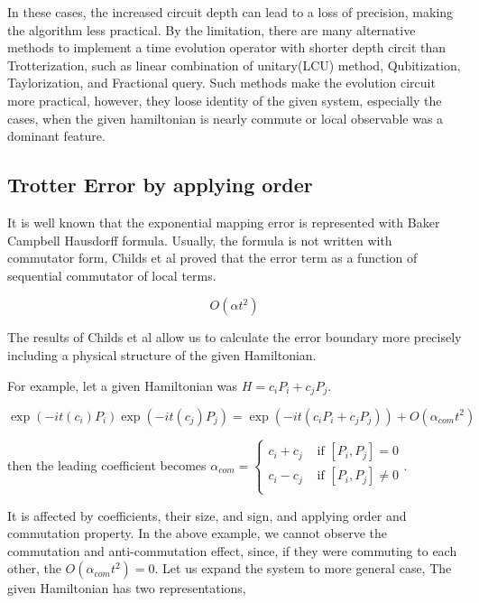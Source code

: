 \documentclass[a4paper,12pt]{article}
\begin{document}
In these cases, the increased circuit depth can lead to a loss of precision, making the algorithm less practical.
By the limitation, there are many alternative methods to implement a time evolution operator 
with shorter depth circit than Trotterization, such as 
linear combination of unitary(LCU) method\cite{dewolf2023quantumcomputinglecturenotes}, Qubitization\cite{Low_2019}, 
Taylorization\cite{PhysRevLett.114.090502}, and Fractional query\cite{Berry_2014}.
Such methods make the evolution circuit more practical, however, they loose 
identity of the given system, especially the cases, when the given hamiltonian is nearly commute
or local observable was a dominant feature\cite{childs_theory_2021}. 

\subsection{Trotter Error by applying order}

It is well known that the exponential mapping error is represented with Baker Campbell Hausdorff formula.
Usually, the formula is not written with commutator form, Childs et al proved that the error term 
as a function of sequential commutator of local terms.%

\begin{equation}
    O(\alpha t^2)
\end{equation}

The results of Childs et al allow us to calculate 
the error boundary more precisely including a physical structure 
of the given Hamiltonian.

For example, let a given Hamiltonian was $H = c_i P_i + c_j P_j$.

\begin{equation}
    \exp(-it (c_i) P_i) \exp(-it (c_j) P_j) = \exp(- it (c_i P_i + c_j P_j)) + O (\alpha_{com}t^2)
\end{equation}

then the leading coefficient becomes $\alpha_{com} = \begin{cases}
    c_i + c_j & \mbox{ if } [P_i, P_j] = 0 \\
    c_i - c_j & \mbox{ if } [P_i, P_j] \neq 0 \\
\end{cases}$.

It is affected by coefficients, their size, and sign, and 
applying order and commutation property.
In the above example, we cannot observe the commutation and anti-commutation
effect, since, if they were commuting to each other, the $O(\alpha_{com} t^2) = 0$.
Let us expand the system to more general case, 
The given Hamiltonian has two representations,
\end{document}
